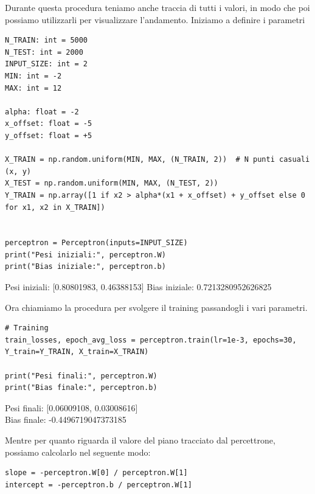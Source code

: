 Durante questa procedura teniamo anche traccia di tutti i valori, in modo che poi possiamo 
utilizzarli per visualizzare l'andamento.
\newpage
Iniziamo a definire i parametri 
\begin{lstlisting}
N_TRAIN: int = 5000
N_TEST: int = 2000
INPUT_SIZE: int = 2
MIN: int = -2
MAX: int = 12

alpha: float = -2
x_offset: float = -5
y_offset: float = +5

X_TRAIN = np.random.uniform(MIN, MAX, (N_TRAIN, 2))  # N punti casuali (x, y)
X_TEST = np.random.uniform(MIN, MAX, (N_TEST, 2))
Y_TRAIN = np.array([1 if x2 > alpha*(x1 + x_offset) + y_offset else 0 for x1, x2 in X_TRAIN])


perceptron = Perceptron(inputs=INPUT_SIZE)
print("Pesi iniziali:", perceptron.W)
print("Bias iniziale:", perceptron.b)

\end{lstlisting}



Pesi iniziali: [0.80801983, 0.46388153]
\newline
Bias iniziale: 0.7213280952626825

\hspace{0.25cm}

Ora chiamiamo la procedura per svolgere il training passandogli i vari parametri.
\begin{lstlisting}
# Training
train_losses, epoch_avg_loss = perceptron.train(lr=1e-3, epochs=30, Y_train=Y_TRAIN, X_train=X_TRAIN)

print("Pesi finali:", perceptron.W)
print("Bias finale:", perceptron.b)
\end{lstlisting}

Pesi finali: [0.06009108, 0.03008616]\\
Bias finale: -0.4496719047373185

\hspace{0.25cm}

Mentre per quanto riguarda il valore del piano tracciato dal percettrone, possiamo calcolarlo nel
seguente modo:
\begin{lstlisting}
slope = -perceptron.W[0] / perceptron.W[1]
intercept = -perceptron.b / perceptron.W[1]
\end{lstlisting}


